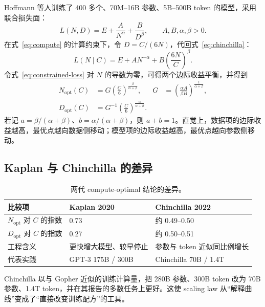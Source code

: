 \documentclass[UTF8,10pt,a4paper,fontset=none]{ctexart}
\begin{document}
Hoffmann 等人训练了 400 多个、70M--16B 参数、5B--500B token 的模型，采用联合损失面\cite{hoffmann2022}：
\begin{equation}
  L(N,D)=E+\frac{A}{N^{\alpha}}+\frac{B}{D^{\beta}},
  \qquad A,B,\alpha,\beta>0.
  \label{eq:chinchilla}
\end{equation}
在式~\eqref{eq:compute} 的计算约束下，令 $D=C/(6N)$，代回式~\eqref{eq:chinchilla}：
\begin{equation}
  L(N\mid C)=E+A N^{-\alpha}
  +B\left(\frac{6N}{C}\right)^{\beta}.
  \label{eq:constrained-loss}
\end{equation}
令式~\eqref{eq:constrained-loss} 对 $N$ 的导数为零，可得两个边际收益平衡，并得到
\begin{align}
  N_{\mathrm{opt}}(C)
  &=G\left(\frac{C}{6}\right)^{\frac{\beta}{\alpha+\beta}},
  &G&=\left(\frac{\alpha A}{\beta B}\right)^{\frac{1}{\alpha+\beta}},
  \label{eq:nopt}\\
  D_{\mathrm{opt}}(C)
  &=G^{-1}\left(\frac{C}{6}\right)^{\frac{\alpha}{\alpha+\beta}}.
  \label{eq:dopt}
\end{align}
若记 $a=\beta/(\alpha+\beta)$、$b=\alpha/(\alpha+\beta)$，则 $a+b=1$。直觉上，数据项的边际收益越高，最优点越向数据侧移动；模型项的边际收益越高，最优点越向参数侧移动。

\subsection{Kaplan 与 Chinchilla 的差异}

\begin{table}[htbp]
\centering
\caption{两代 compute-optimal 结论的差异。}
\label{tab:kaplan-chinchilla}
\begin{tabularx}{\textwidth}{Y C{3.2cm} C{3.2cm}}
\toprule
比较项 & Kaplan 2020 & Chinchilla 2022 \\
\midrule
$N_{\mathrm{opt}}$ 对 $C$ 的指数 & 0.73 & 约 0.49--0.50 \\
$D_{\mathrm{opt}}$ 对 $C$ 的指数 & 0.27 & 约 0.50--0.51 \\
工程含义 & 更快增大模型、较早停止 & 参数与 token 近似同比例增长 \\
代表实践 & GPT-3 175B / 300B & Chinchilla 70B / 1.4T \\
\bottomrule
\end{tabularx}
\end{table}

Chinchilla 以与 Gopher 近似的训练计算量，把 280B 参数、300B token 改为 70B 参数、1.4T token，并在其报告的多数任务上更好\cite{rae2021,hoffmann2022}。这使 scaling law 从“解释曲线”变成了“直接改变训练配方”的工具。
\end{document}
